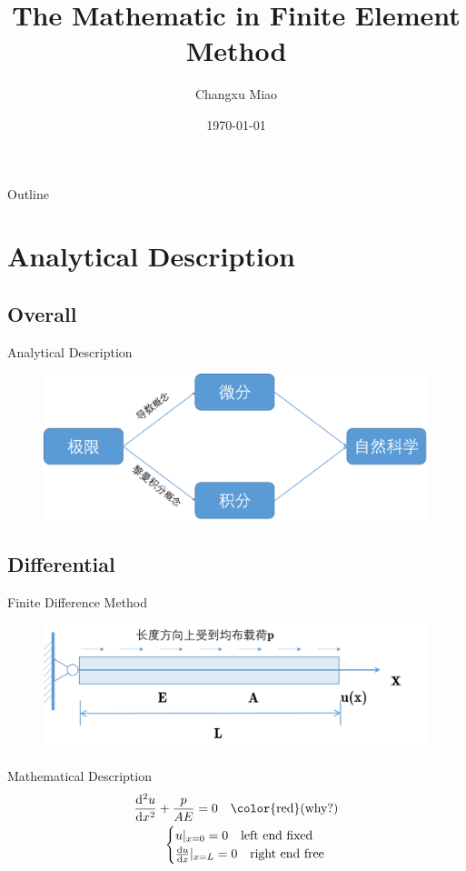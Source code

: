 \documentclass[11pt]{beamer}
\begin{document}
\author{Changxu Miao}
\title[Math in FEM]{The Mathematic in Finite Element Method}
\subtitle{}
\date{\today}
\frame[plain]{\maketitle}

\begin{frame}{Outline}
\tableofcontents %
\end{frame}

\section{Analytical Description}
\subsection{Overall}
\begin{frame}{Analytical Description}
\begin{figure}
\centering
\includegraphics[width=0.9\linewidth]{source/zongshu}
\end{figure}
\end{frame}

\subsection{Differential}
\begin{frame}{Finite Difference Method}
\begin{figure}
\centering
\includegraphics[width=0.7\linewidth]{source/differential}
\end{figure}
\begin{block}{Mathematical Description}
\begin{align*}
\frac{\mathrm{d}^2u}{\mathrm{d}x^2}+\frac{p}{AE}=0\quad\text{\color{red}(why?)}\\
\begin{cases}
u|_{x=0}=0 \quad\text{left end fixed}\\
\frac{\mathrm{d}u}{\mathrm{d}x}|_{x=L}=0\quad\text{right end free}
\end{cases}
\end{align*}
\end{block}
\end{frame}
\end{document}
